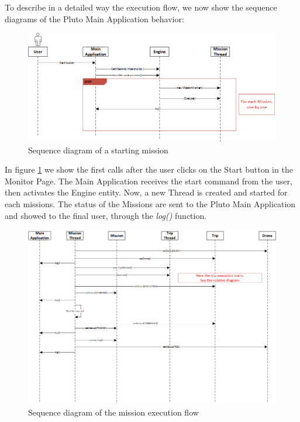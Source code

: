 To describe in a detailed way the execution flow, we now show the sequence diagrams of the Pluto Main Application behavior:
\\

\begin{figure}[H]
  \centering
  \includegraphics[width=\linewidth]{pictures/Alfalfa_Sequence_MissionStart.png}
  \caption{Sequence diagram of a starting mission}
  \label{fig:alfalfaSequence1}
\end{figure}

In figure \ref{fig:alfalfaSequence1} we show the first calls after the user clicks on the Start button in the Monitor Page.
The Main Application receives the start command from the user, then activates the Engine entity. Now, a new Thread is created and started for each missions. The status of the Missions are sent to the Pluto Main Application and showed to the final user, through the \textit{log()} function.
\\

\begin{figure}[H]
  \centering
  \includegraphics[width=\linewidth]{pictures/Alfalfa_Sequence_MissionExecution.png}
  \caption{Sequence diagram of the mission execution flow}
  \label{fig:alfalfaSequence2}
\end{figure}

